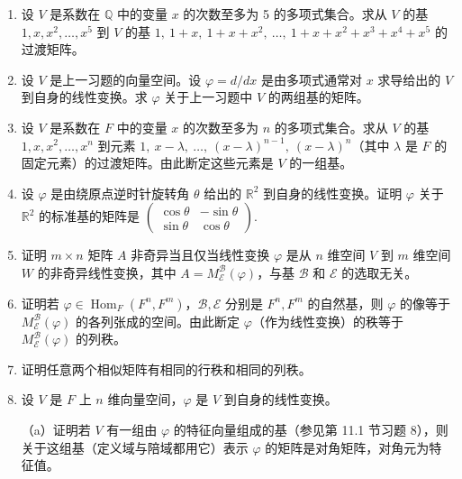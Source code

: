 \begin{enumerate}
\item 设 \(V\) 是系数在 \(\mathbb{Q}\) 中的变量 \(x\) 的次数至多为 5 的多项式集合。求从 \(V\) 的基 \(1, x, x^2, \ldots, x^5\) 到 \(V\) 的基 \(1,\ 1+x,\ 1+x+x^2,\ \ldots,\ 1+x+x^2+x^3+x^4+x^5\) 的过渡矩阵。

\item 设 \(V\) 是上一习题的向量空间。设 \(\varphi = d/dx\) 是由多项式通常对 \(x\) 求导给出的 \(V\) 到自身的线性变换。求 \(\varphi\) 关于上一习题中 \(V\) 的两组基的矩阵。

\item 设 \(V\) 是系数在 \(F\) 中的变量 \(x\) 的次数至多为 \(n\) 的多项式集合。求从 \(V\) 的基 \(1, x, x^2, \ldots, x^n\) 到元素 \(1,\ x-\lambda,\ \ldots,\ (x-\lambda)^{n-1},\ (x-\lambda)^n\)（其中 \(\lambda\) 是 \(F\) 的固定元素）的过渡矩阵。由此断定这些元素是 \(V\) 的一组基。

\item 设 \(\varphi\) 是由绕原点逆时针旋转角 \(\theta\) 给出的 \(\mathbb{R}^2\) 到自身的线性变换。证明 \(\varphi\) 关于 \(\mathbb{R}^2\) 的标准基的矩阵是 \(\begin{pmatrix} \cos\theta & -\sin\theta \\ \sin\theta & \cos\theta \end{pmatrix}\).

\item 证明 \(m \times n\) 矩阵 \(A\) 非奇异当且仅当线性变换 \(\varphi\) 是从 \(n\) 维空间 \(V\) 到 \(m\) 维空间 \(W\) 的非奇异线性变换，其中 \(A = M_{\mathcal{E}}^{\mathcal{B}}(\varphi)\)，与基 \(\mathcal{B}\) 和 \(\mathcal{E}\) 的选取无关。

\item 证明若 \(\varphi \in \operatorname{Hom}_F(F^n, F^m)\)，\(\mathcal{B}, \mathcal{E}\) 分别是 \(F^n, F^m\) 的自然基，则 \(\varphi\) 的像等于 \(M_{\mathcal{E}}^{\mathcal{B}}(\varphi)\) 的各列张成的空间。由此断定 \(\varphi\)（作为线性变换）的秩等于 \(M_{\mathcal{E}}^{\mathcal{B}}(\varphi)\) 的列秩。

\item 证明任意两个相似矩阵有相同的行秩和相同的列秩。

\item 设 \(V\) 是 \(F\) 上 \(n\) 维向量空间，\(\varphi\) 是 \(V\) 到自身的线性变换。

（a）证明若 \(V\) 有一组由 \(\varphi\) 的特征向量组成的基（参见第 11.1 节习题 8），则关于这组基（定义域与陪域都用它）表示 \(\varphi\) 的矩阵是对角矩阵，对角元为特征值。


\end{enumerate}
